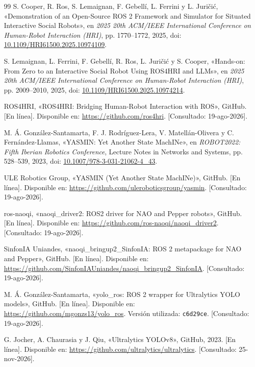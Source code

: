 \documentclass[11pt,letterpaper]{article}
\begin{document}
\begin{thebibliography}{99}
 S. Cooper, R. Ros, S. Lemaignan, F. Gebellí, L. Ferrini y L. Juri\v{c}i\'{c}, «Demonstration of an Open-Source ROS 2 Framework and Simulator for Situated Interactive Social Robots», en \emph{2025 20th ACM/IEEE International Conference on Human-Robot Interaction (HRI)}, pp. 1770--1772, 2025, doi: \href{https://doi.org/10.1109/HRI61500.2025.10974109}{10.1109/HRI61500.2025.10974109}.

 S. Lemaignan, L. Ferrini, F. Gebellí, R. Ros, L. Juri\v{c}i\'{c} y S. Cooper, «Hands-on: From Zero to an Interactive Social Robot Using ROS4HRI and LLMs», en \emph{2025 20th ACM/IEEE International Conference on Human-Robot Interaction (HRI)}, pp. 2009--2010, 2025, doi: \href{https://doi.org/10.1109/HRI61500.2025.10974214}{10.1109/HRI61500.2025.10974214}.

 ROS4HRI, «ROS4HRI: Bridging Human-Robot Interaction with ROS», GitHub. [En línea]. Disponible en: \url{https://github.com/ros4hri}. [Consultado: 19-ago-2026].

 M. Á. González-Santamarta, F. J. Rodríguez-Lera, V. Matellán-Olivera y C. Fernández-Llamas, «YASMIN: Yet Another State MachINe», en \emph{ROBOT2022: Fifth Iberian Robotics Conference}, Lecture Notes in Networks and Systems, pp. 528--539, 2023, doi: \href{https://doi.org/10.1007/978-3-031-21062-4_43}{10.1007/978-3-031-21062-4\_43}.

 ULE Robotics Group, «YASMIN (Yet Another State MachINe)», GitHub. [En línea]. Disponible en: \url{https://github.com/uleroboticsgroup/yasmin}. [Consultado: 19-ago-2026].

 ros-naoqi, «naoqi\_driver2: ROS2 driver for NAO and Pepper robots», GitHub. [En línea]. Disponible en: \url{https://github.com/ros-naoqi/naoqi_driver2}. [Consultado: 19-ago-2026].

 SinfonIA Uniandes, «naoqi\_bringup2\_SinfonIA: ROS 2 metapackage for NAO and Pepper», GitHub. [En línea]. Disponible en: \url{https://github.com/SinfonIAUniandes/naoqi_bringup2_SinfonIA}. [Consultado: 19-ago-2026].

 M. Á. González-Santamarta, «yolo\_ros: ROS 2 wrapper for Ultralytics YOLO models», GitHub. [En línea]. Disponible en: \url{https://github.com/mgonzs13/yolo_ros}. Versión utilizada: \texttt{c6d29ce}. [Consultado: 19-ago-2026].

 G. Jocher, A. Chaurasia y J. Qiu, «Ultralytics YOLOv8», GitHub, 2023. [En línea]. Disponible en: \url{https://github.com/ultralytics/ultralytics}. [Consultado: 25-nov-2026].


\end{thebibliography}
\end{document}
